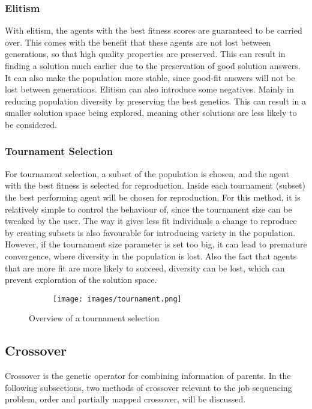 \documentclass{article}
\begin{document}
\bigskip
\subsubsection{Elitism}
With elitism, the agents with the best fitness scores are guaranteed to be carried over. This comes with the benefit that these agents are not lost between generations, so that high quality properties are preserved. This can result in finding a solution much earlier due to the preservation of good solution answers. It can also make the population more stable, since good-fit answers will not be lost between generations.\smallskip
Elitism can also introduce some negatives. Mainly in reducing population diversity by preserving the best genetics. This can result in a smaller solution space being explored, meaning other solutions are less likely to be considered.

\bigskip
\subsubsection{Tournament Selection}
For tournament selection, a subset of the population is chosen, and the agent with the best fitness is selected for reproduction. Inside each tournament (subset) the best performing agent will be chosen for reproduction. For this method, it is relatively simple to control the behaviour of, since the tournament size can be tweaked by the user. The way it gives less fit individuals a change to reproduce by creating subsets is also favourable for introducing variety in the population.\smallskip 
However, if the tournament size parameter is set too big, it can lead to premature convergence, where diversity in the population is lost. Also the fact that agents that are more fit are more likely to succeed, diversity can be lost, which can prevent exploration of the solution space.

\begin{figure}
  \centering
  \begin{subfigure}[H]{0.5\linewidth}
    \texttt{[image: images/tournament.png]}
  \end{subfigure}
  \caption{Overview of a tournament selection}
  \label{fig:tournament}
\end{figure}

\newpage
\subsection{Crossover}
Crossover is the genetic operator for combining information of parents. In the following subsections, two methods of crossover relevant to the job sequencing problem, order and partially mapped crossover, will be discussed.
\end{document}
